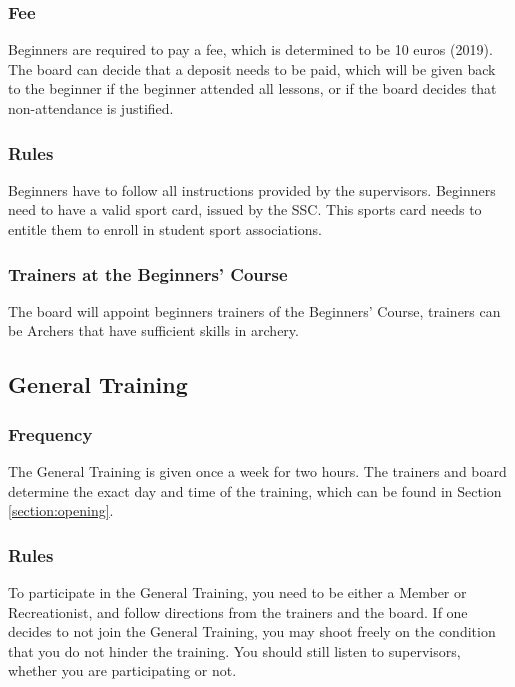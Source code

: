 \documentclass[a4paper]{article}
\begin{document}
\subsubsection{Fee}
{ Beginners} are required to pay a fee, which is determined to be 10 euros {\g (2019)}. The board can decide that a deposit needs to be paid, which will be given back to the { beginner} if the { beginner} attended all lessons, or if the board decides that non-attendance is justified.

\subsubsection{Rules}
{ Beginners} have to follow all instructions provided by the { supervisors}. { Beginners} need to have a valid sport card, issued by the { SSC}. This sports card needs to entitle them to enroll in student sport associations.

\subsubsection{Trainers at the Beginners' Course}
The board will appoint { beginners} trainers of the { Beginners' Course}, trainers can be { Archers} that have sufficient skills in archery.

\subsection{General Training}
\subsubsection{Frequency}
The { General Training} is given once a week for two hours. The trainers and board determine the exact day and time of the training, which can be found in Section \ref{section:opening}.

\subsubsection{Rules}
To participate in the { General Training}, you need to be either a { Member} or { Recreationist}, and follow directions from the trainers and the board. If one decides to not join the { General Training}, you may shoot freely on the condition that you do not hinder the training. You should still listen to { supervisors}, whether you are participating or not.
\end{document}
